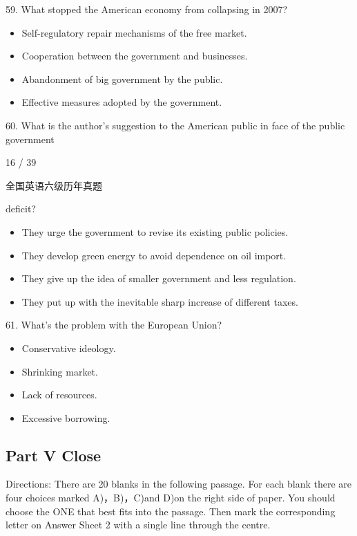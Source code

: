 \documentclass[UTF8,11pt]{ctexart}
\begin{document}
59. What stopped the American economy from collapsing in 2007?


\begin{itemize}[leftmargin=2em,itemsep=.2em,topsep=.4em]\item[A.] Self-regulatory repair mechanisms of the free market.
\item[B.] Cooperation between the government and businesses.
\item[C.] Abandonment of big government by the public.
\item[D.] Effective measures adopted by the government.
\end{itemize}

60. What is the author’s suggestion to the American public in face of the public government


16 / 39


全国英语六级历年真题


deficit?


\begin{itemize}[leftmargin=2em,itemsep=.2em,topsep=.4em]\item[A.] They urge the government to revise its existing public policies.
\item[B.] They develop green energy to avoid dependence on oil import.
\item[C.] They give up the idea of smaller government and less regulation.
\item[D.] They put up with the inevitable sharp increase of different taxes.
\end{itemize}

61. What’s the problem with the European Union?


\begin{itemize}[leftmargin=2em,itemsep=.2em,topsep=.4em]\item[A.] Conservative ideology.
\item[B.] Shrinking market.
\item[C.] Lack of resources.
\item[D.] Excessive borrowing.
\end{itemize}

\subsection*{\textbf{Part} \textbf{V} \textbf{Close}}


Directions: There are 20 blanks in the following passage. For each blank there are four choices marked A)，B)，C)and D)on the right side of paper. You should choose the ONE that best fits into the passage. Then mark the corresponding letter on Answer Sheet 2 with a single line through the centre.
\end{document}
